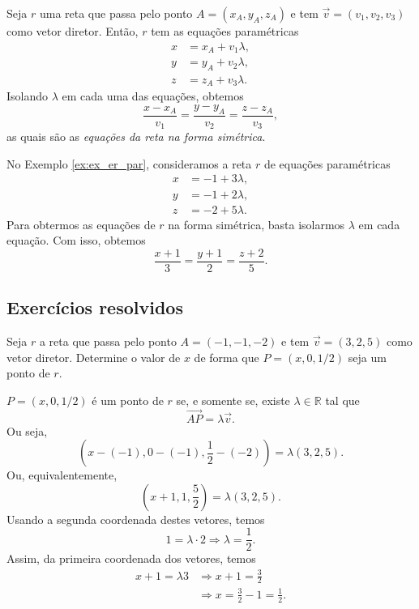 Seja $r$ uma reta que passa pelo ponto $A = (x_A,y_A,z_A)$ e tem $\vec{v} = (v_1,v_2,v_3)$ como vetor diretor. Então, $r$ tem as equações paramétricas
\begin{align}
  x &= x_A + v_1\lambda,\\
  y &= y_A + v_2\lambda,\\
  z &= z_A + v_3\lambda.
\end{align}
Isolando $\lambda$ em cada uma das equações, obtemos
\begin{equation}
  \frac{x-x_A}{v_1} = \frac{y-y_A}{v_2} = \frac{z-z_A}{v_3},
\end{equation}
as quais são as \emph{equações da reta na forma simétrica}.

\begin{ex}
  No Exemplo \ref{ex:ex_er_par}, consideramos a reta $r$ de equações paramétricas
  \begin{align}
    x &= -1 + 3\lambda,\\
    y &= -1 + 2\lambda,\\
    z &= -2 + 5\lambda.    
  \end{align}
  Para obtermos as equações de $r$ na forma simétrica, basta isolarmos $\lambda$ em cada equação. Com isso, obtemos
  \begin{equation}
    \frac{x+1}{3} = \frac{y+1}{2} = \frac{z+2}{5}.
  \end{equation}
\end{ex}

\subsection{Exercícios resolvidos}

\begin{exeresol}
  Seja $r$ a reta que passa pelo ponto $A = (-1,-1,-2)$ e tem $\vec{v} = (3,2,5)$ como vetor diretor. Determine o valor de $x$ de forma que $P = (x,0,1/2)$ seja um ponto de $r$.
\end{exeresol}
\begin{resol}
  $P = (x,0,1/2)$ é um ponto de $r$ se, e somente se, existe $\lambda\in\mathbb{R}$ tal que
  \begin{equation}
    \overrightarrow{AP} = \lambda\vec{v}.
  \end{equation}
  Ou seja,
  \begin{equation}
    \left(x-(-1),0-(-1),\frac{1}{2}-(-2)\right) = \lambda (3,2,5).
  \end{equation}
  Ou, equivalentemente,
  \begin{equation}
    \left(x+1,1,\frac{5}{2}\right) = \lambda (3,2,5).
  \end{equation}
  Usando a segunda coordenada destes vetores, temos
  \begin{equation}
    1 = \lambda\cdot 2 \Rightarrow \lambda = \frac{1}{2}.
  \end{equation}
  Assim, da primeira coordenada dos vetores, temos
  \begin{align}
    x+1 = \lambda 3 &\Rightarrow x+1 = \frac{3}{2}\\
                    &\Rightarrow x = \frac{3}{2}-1 = \frac{1}{2}.
  \end{align}
\end{resol}

